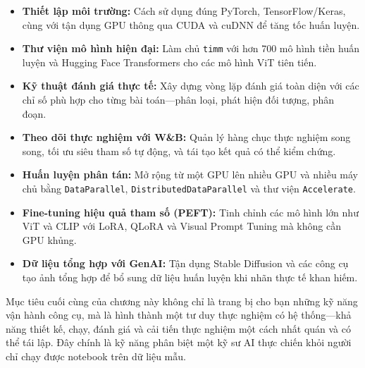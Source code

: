 \begin{itemize}
    \item \textbf{Thiết lập môi trường:} Cách sử dụng đúng PyTorch, TensorFlow/Keras, cùng với tận dụng GPU thông qua CUDA và cuDNN để tăng tốc huấn luyện.

    \item \textbf{Thư viện mô hình hiện đại:} Làm chủ \texttt{timm} với hơn 700 mô hình tiền huấn luyện và Hugging Face Transformers cho các mô hình ViT tiên tiến.

    \item \textbf{Kỹ thuật đánh giá thực tế:} Xây dựng vòng lặp đánh giá toàn diện với các chỉ số phù hợp cho từng bài toán---phân loại, phát hiện đối tượng, phân đoạn.

    \item \textbf{Theo dõi thực nghiệm với W\&B:} Quản lý hàng chục thực nghiệm song song, tối ưu siêu tham số tự động, và tái tạo kết quả có thể kiểm chứng.

    \item \textbf{Huấn luyện phân tán:} Mở rộng từ một GPU lên nhiều GPU và nhiều máy chủ bằng \texttt{DataParallel}, \texttt{DistributedDataParallel} và thư viện \texttt{Accelerate}.

    \item \textbf{Fine-tuning hiệu quả tham số (PEFT):} Tinh chỉnh các mô hình lớn như ViT và CLIP với LoRA, QLoRA và Visual Prompt Tuning mà không cần GPU khủng.

    \item \textbf{Dữ liệu tổng hợp với GenAI:} Tận dụng Stable Diffusion và các công cụ tạo ảnh tổng hợp để bổ sung dữ liệu huấn luyện khi nhãn thực tế khan hiếm.
\end{itemize}

Mục tiêu cuối cùng của chương này không chỉ là trang bị cho bạn những kỹ năng vận hành công cụ, mà là hình thành một tư duy thực nghiệm có hệ thống---khả năng thiết kế, chạy, đánh giá và cải tiến thực nghiệm một cách nhất quán và có thể tái lập. Đây chính là kỹ năng phân biệt một kỹ sư AI thực chiến khỏi người chỉ chạy được notebook trên dữ liệu mẫu.
